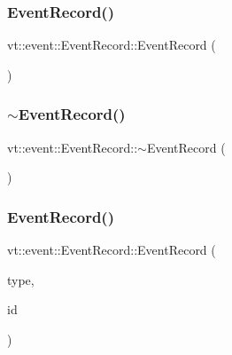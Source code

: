 \subsubsection{\texorpdfstring{Event\+Record()}{EventRecord()}\hspace{0.1cm}{\footnotesize\ttfamily [1/2]}}
{\footnotesize\ttfamily vt\+::event\+::\+Event\+Record\+::\+Event\+Record (\begin{DoxyParamCaption}{ }\end{DoxyParamCaption})\hspace{0.3cm}{\ttfamily [default]}}

\mbox{\label{structvt_1_1event_1_1_event_record_ae46827dcbe7eab923e6083006475fa65}} 
\subsubsection{\texorpdfstring{$\sim$\+Event\+Record()}{~EventRecord()}}
{\footnotesize\ttfamily vt\+::event\+::\+Event\+Record\+::$\sim$\+Event\+Record (\begin{DoxyParamCaption}{ }\end{DoxyParamCaption})\hspace{0.3cm}{\ttfamily [virtual]}}

\mbox{\label{structvt_1_1event_1_1_event_record_afee008ad8096ff0aa3a6bed7e94d9701}} 
\subsubsection{\texorpdfstring{Event\+Record()}{EventRecord()}\hspace{0.1cm}{\footnotesize\ttfamily [2/2]}}
{\footnotesize\ttfamily vt\+::event\+::\+Event\+Record\+::\+Event\+Record (\begin{DoxyParamCaption}\item[{\hyperlink{namespacevt_1_1event_a1ea9fec44d101bf40b8fd786d44ebed9}{Event\+Record\+Type} const \&}]{type,  }\item[{\hyperlink{namespacevt_a009267401def7ae8bf201892222d060f}{Event\+Type} const \&}]{id }\end{DoxyParamCaption})}



